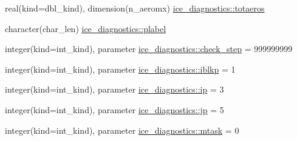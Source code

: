\begin{DoxyCompactItemize}
\item 
real(kind=dbl\_\-kind), dimension(n\_\-aeromx) \hyperlink{namespaceice__diagnostics_a0fbcc49b04eb0b1f8ec682886abec653}{ice\_\-diagnostics::totaeros}
\item 
character(char\_\-len) \hyperlink{namespaceice__diagnostics_a155e02068d3900d95eda6c6a3a52cb9f}{ice\_\-diagnostics::plabel}
\item 
integer(kind=int\_\-kind), parameter \hyperlink{namespaceice__diagnostics_a56f414ee41003dd64ac88912858325bb}{ice\_\-diagnostics::check\_\-step} = 999999999
\item 
integer(kind=int\_\-kind), parameter \hyperlink{namespaceice__diagnostics_ac94aaaf81208df171bff46a024ccdcb1}{ice\_\-diagnostics::iblkp} = 1
\item 
integer(kind=int\_\-kind), parameter \hyperlink{namespaceice__diagnostics_a7effd9287958acac49fd0283763b7bee}{ice\_\-diagnostics::ip} = 3
\item 
integer(kind=int\_\-kind), parameter \hyperlink{namespaceice__diagnostics_a10a3f8830dada38c8bc78c01adf3e435}{ice\_\-diagnostics::jp} = 5
\item 
integer(kind=int\_\-kind), parameter \hyperlink{namespaceice__diagnostics_ad2f5352613b9b67de6d460e59a6b8bc4}{ice\_\-diagnostics::mtask} = 0
\end{DoxyCompactItemize}

